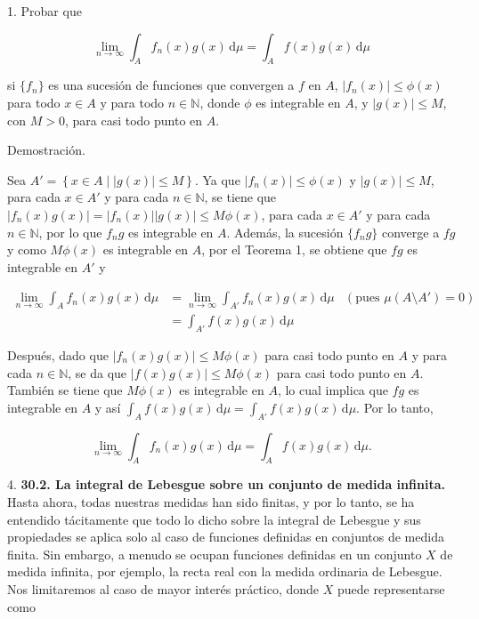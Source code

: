 \documentclass[fleqn]{article}
\begin{document}
	1. Probar que

	\begin{equation*}
		\lim_{n \to \infty} \int_{A} f_n(x) g(x) \, \mathrm{d} \mu = \int_{A} f(x) g(x) \, \mathrm{d} \mu
	\end{equation*}

	si $ \lbrace f_n \rbrace $ es una sucesión de funciones que convergen a $f$ en $A$, $ \left| f_n (x) \right| \leq \phi (x) $ para todo $ x \in A $ y para todo $ n \in \mathbb{N} $, donde $ \phi $ es integrable en $A$, y $ \left| g(x) \right| \leq M $, con $ M > 0 $, para casi todo punto en $A$.

	Demostración.

	Sea $ A' = \left\lbrace x \in A \mid \left| g(x) \right| \leq M \right\rbrace $. Ya que $ \left| f_n (x) \right| \leq \phi (x) $ y $ \left| g(x) \right| \leq M $, para cada $ x \in A' $ y para cada $ n \in \mathbb{N} $, se tiene que $ \left| f_n (x) g(x) \right| = \left| f_n (x) \right| \left| g(x) \right| \leq M \phi (x) $, para cada $ x \in A' $ y para cada $ n \in \mathbb{N} $, por lo que $ f_n g $ es integrable en $A$. Además, la sucesión $ \lbrace f_n g \rbrace $ converge a $ fg $ y como $ M \phi (x) $ es integrable en $A$, por el Teorema 1, se obtiene que $ fg $ es integrable en $ A' $ y

	\begin{align*}
		\lim_{n \to \infty} \int_{A} f_n(x) g(x) \, \mathrm{d} \mu
		&= \lim_{n \to \infty} \int_{A'} f_n(x) g(x) \, \mathrm{d} \mu & \left( \mbox{pues } \mu \left( A \setminus A' \right) = 0 \right) \\
		&= \int_{A'} f(x) g(x) \, \mathrm{d} \mu
	\end{align*}

	Después, dado que $ \left| f_n (x) g(x) \right| \leq M \phi (x) $ para casi todo punto en $A$ y para cada $ n \in \mathbb{N} $, se da que $ \left| f(x) g(x) \right| \leq M \phi (x) $ para casi todo punto en $A$. También se tiene que $ M \phi (x) $ es integrable en $A$, lo cual implica que $ fg $ es integrable en $A$ y así $ \displaystyle \int_{A} f(x) g(x) \, \mathrm{d} \mu = \int_{A'} f(x) g(x) \, \mathrm{d} \mu $. Por lo tanto, 

	\begin{equation*}
		\lim_{n \to \infty} \int_{A} f_n(x) g(x) \, \mathrm{d} \mu = \int_{A} f(x) g(x) \, \mathrm{d} \mu.
	\end{equation*}

	4. \textbf{30.2. La integral de Lebesgue sobre un conjunto de medida infinita.} Hasta ahora, todas nuestras medidas han sido finitas, y por lo tanto, se ha entendido tácitamente que todo lo dicho sobre la integral de Lebesgue y sus propiedades se aplica solo al caso de funciones definidas en conjuntos de medida finita. Sin embargo, a menudo se ocupan funciones definidas en un conjunto $X$ de medida infinita, por ejemplo, la recta real con la medida ordinaria de Lebesgue. Nos limitaremos al caso de mayor interés práctico, donde $X$ puede representarse como
\end{document}
